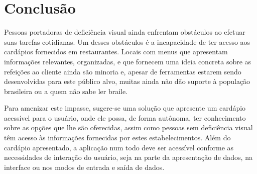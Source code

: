 \chapter{\label{chap:conclu}Conclusão}

Pessoas portadoras de deficiência visual ainda enfrentam obstáculos ao efetuar suas tarefas cotidianas. Um desses obstáculos é a incapacidade de ter acesso aos cardápios fornecidos em restaurantes. Locais com menus que apresentam informações relevantes, organizadas, e que fornecem uma ideia concreta sobre as refeições ao cliente ainda são minoria e, apesar de ferramentas estarem sendo desenvolvidas para este público alvo, muitas ainda não dão suporte à população brasileira ou a quem não sabe ler braile.

Para amenizar este impasse, sugere-se uma solução que apresente um cardápio acessível para o usuário, onde ele possa, de forma autônoma, ter conhecimento sobre as opções que lhe são oferecidas, assim como pessoas sem deficiência visual têm acesso às informações fornecidas por estes estabelecimentos. Além do cardápio apresentado, a aplicação num todo deve ser acessível conforme as necessidades de interação do usuário, seja na parte da apresentação de dados, na interface ou nos modos de entrada e saída de dados.

